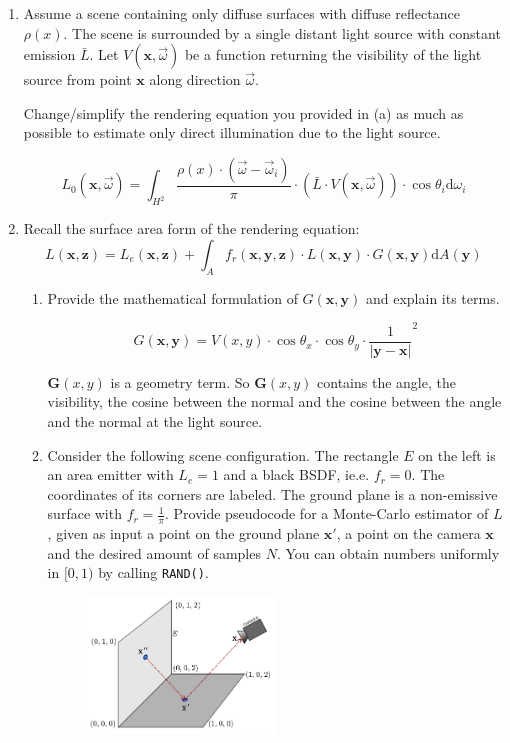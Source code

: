\documentclass[10pt,\jkfside,a4paper]{article}
\begin{document}
\begin{enumerate}
\item Assume a scene containing only diffuse surfaces with diffuse
reflectance $\rho(x)$. The scene is surrounded by a single distant light
source with constant emission $\bar{L}$. Let $V(\mathbf{x},
\stackrel{\to}{\omega})$ be a function returning the visibility of the light
source from point $\mathbf{x}$ along direction $\stackrel{\to}{\omega}$.

Change/simplify the rendering equation you provided in (a) as much as
possible to estimate only direct illumination due to the light source.

\[
L_0(\mathbf{x}, \stackrel{\to}{\omega}) = \int_{H^2} \frac{\rho(x)\cdot
(\stackrel{\to}{\omega} - \stackrel{\to}{\omega}_i)
}{\pi} \cdot (\bar{L}\cdot V (\mathbf{x}, \stackrel{\to}{\omega}))
\cdot \cos \theta_i \text{d}\omega_i
\]

\item Recall the surface area form of the rendering equation:
\[
L(\mathbf{x}, \mathbf{z}) = L_e(\mathbf{x}, \mathbf{z}) + \int_A
f_r(\mathbf{x}, \mathbf{y}, \mathbf{z}) \cdot L(\mathbf{x}, \mathbf{y}) \cdot
G(\mathbf{x}, \mathbf{y}) \text{d}A(\mathbf{y})
\]

\begin{enumerate}

\item Provide the mathematical formulation of $G(\mathbf{x}, \mathbf{y})$
and explain its terms.

\[
G(\mathbf{x}, \mathbf{y}) = V(x, y)
\cdot \cos\theta_x \cdot \cos\theta_y
\cdot \frac{1}{|\mathbf{y} - \mathbf{x}|}^2
\]

{\color{blue}
$\mathbf{G}(x, y)$ is a geometry term. So $\mathbf{G}(x, y)$ contains the
angle, the visibility, the cosine between the normal and the cosine between
the angle and the normal at the light source.
}

\item Consider the following scene configuration. The rectangle $E$ on the
left is an area emitter with $L_e = 1$ and a black BSDF, ie.e. $f_r = 0$.
The coordinates of its corners are labeled. The ground plane is a
non-emissive surface with $f_r = \frac{1}{\pi}$. Provide pseudocode for a
Monte-Carlo estimator of $L$, given as input a point on the ground plane
$\mathbf{x}'$, a point on the camera $\mathbf{x}$ and the desired amount of
samples $N$. You can obtain numbers uniformly in $[0, 1)$ by calling
\texttt{RAND()}.

\begin{figure}[H]
\centering
\includegraphics[width=0.5\textwidth]{./monte_carlo_exam_question}
\end{figure}


\end{enumerate}
\end{enumerate}
\end{document}
